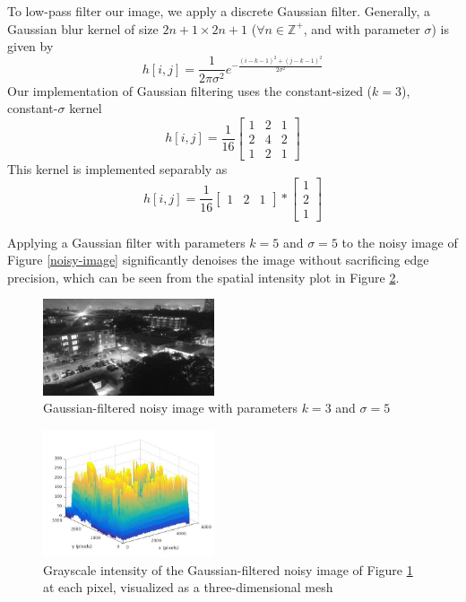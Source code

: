 \documentclass[journal]{IEEEtran}
\begin{document}
To low-pass filter our image, we apply a discrete Gaussian filter. Generally, a Gaussian blur kernel of size $2n + 1 \times 2n + 1$ ($\forall n \in \mathbb{Z}^+$, and with parameter $\sigma$) is given by
$$h[i, j] = \frac{1}{2\pi \sigma^2}e^{-\frac{(i - k - 1)^2 + (j - k - 1)^2}{2\sigma^2}}$$
Our implementation of Gaussian filtering uses the constant-sized ($k = 3$), constant-$\sigma$ kernel
\[
h[i, j] = \frac{1}{16}
\begin{bmatrix}
	1 & 2 & 1 \\
	2 & 4 & 2 \\
	1 & 2 & 1
\end{bmatrix}
\]
This kernel is implemented separably as
\begin{equation}
	\label{gaussian-filter}
	h[i, j] = \frac{1}{16}
	\begin{bmatrix}
		1 & 2 & 1
	\end{bmatrix}
	*
	\begin{bmatrix}
		1 \\ 2 \\ 1
	\end{bmatrix}
\end{equation}
\par Applying a Gaussian filter with parameters $k = 5$ and $\sigma = 5$ to the noisy image of Figure \ref{noisy-image} significantly denoises the image without sacrificing edge precision, which can be seen from the spatial intensity plot in Figure \ref{filtered-noisy-image-mesh}.
\begin{figure}[H]
	\centering
	\includegraphics[width=0.45\textwidth]{filtered_noisy_image.jpg}
	\caption{Gaussian-filtered noisy image with parameters $k = 3$ and $\sigma = 5$}
    \label{filtered-noisy-image}
\end{figure}
\begin{figure}[h]
	\centering
	\includegraphics[width=0.45\textwidth]{filtered_noisy_image_mesh.jpg}
	\caption{Grayscale intensity of the Gaussian-filtered noisy image of Figure \ref{filtered-noisy-image} at each pixel, visualized as a three-dimensional mesh}
    \label{filtered-noisy-image-mesh}
\end{figure}
\end{document}
